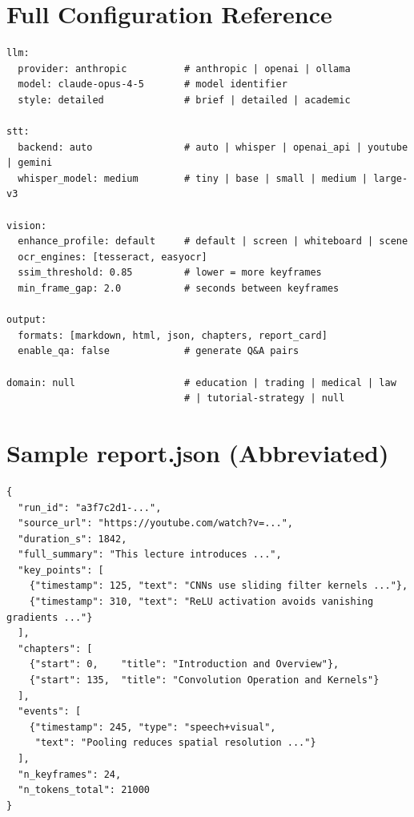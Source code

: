 \documentclass[12pt,a4paper]{article}
\begin{document}
\newpage
\appendix

\section{Full Configuration Reference}
\label{app:config}

\begin{lstlisting}[style=plain, caption={Annotated config.yaml.}]
llm:
  provider: anthropic          # anthropic | openai | ollama
  model: claude-opus-4-5       # model identifier
  style: detailed              # brief | detailed | academic

stt:
  backend: auto                # auto | whisper | openai_api | youtube | gemini
  whisper_model: medium        # tiny | base | small | medium | large-v3

vision:
  enhance_profile: default     # default | screen | whiteboard | scene
  ocr_engines: [tesseract, easyocr]
  ssim_threshold: 0.85         # lower = more keyframes
  min_frame_gap: 2.0           # seconds between keyframes

output:
  formats: [markdown, html, json, chapters, report_card]
  enable_qa: false             # generate Q&A pairs

domain: null                   # education | trading | medical | law
                               # | tutorial-strategy | null
\end{lstlisting}

\section{Sample report.json (Abbreviated)}
\label{app:json}

\begin{lstlisting}[style=python, caption={Abbreviated report.json from a demo run.}]
{
  "run_id": "a3f7c2d1-...",
  "source_url": "https://youtube.com/watch?v=...",
  "duration_s": 1842,
  "full_summary": "This lecture introduces ...",
  "key_points": [
    {"timestamp": 125, "text": "CNNs use sliding filter kernels ..."},
    {"timestamp": 310, "text": "ReLU activation avoids vanishing gradients ..."}
  ],
  "chapters": [
    {"start": 0,    "title": "Introduction and Overview"},
    {"start": 135,  "title": "Convolution Operation and Kernels"}
  ],
  "events": [
    {"timestamp": 245, "type": "speech+visual",
     "text": "Pooling reduces spatial resolution ..."}
  ],
  "n_keyframes": 24,
  "n_tokens_total": 21000
}
\end{lstlisting}
\end{document}
